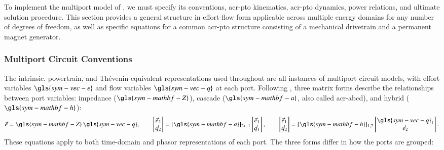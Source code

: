 \label{sec:appendix-pto-model}
To implement the multiport model of , we must specify its
conventions, \gls{acr-pto} kinematics, \gls{acr-pto} dynamics, power relations, and ultimate solution procedure.
This section provides a general structure in effort-flow form applicable across multiple energy domains for any number of degrees of freedom, as well as specific equations for a common \gls{acr-pto} structure consisting of a mechanical drivetrain and a permanent magnet generator.

\subsubsection{Multiport Circuit Conventions}
\label{sec:appendix-multiport}

The intrinsic, powertrain, and Th\'evenin-equivalent representations used throughout  are all instances of multiport circuit models,
with effort variables $\gls{sym-vec-e}$ and flow variables $\gls{sym-vec-q}$ at each port.
Following \citet{reveyrand_multiport_2018}, three matrix forms describe the relationships between port variables:
impedance ($\gls{sym-mathbf-Z}$), cascade ($\gls{sym-mathbf-a}$, also called \gls{acr-abcd}), and hybrid ($\gls{sym-mathbf-h}$):
\begin{equation}\label{eq:multiport-matrix-definitions}
    \vec{e} = \gls{sym-mathbf-Z}\,\gls{sym-vec-q},
\qquad
    \begin{bmatrix}
        \vec{e}_2 \\ \vec{q}_2
    \end{bmatrix}
    = [\gls{sym-mathbf-a}]_{2\leftarrow 1}
    \begin{bmatrix}
        \vec{e}_1 \\ \vec{q}_1
    \end{bmatrix},
\qquad
    \begin{bmatrix}
        \vec{e}_1 \\ \vec{q}_2
    \end{bmatrix}
    = [\gls{sym-mathbf-h}]_{1,2}
    \begin{bmatrix}
        \gls{sym-vec-q}_1 \\ \vec{e}_2
    \end{bmatrix}.
\end{equation}
These equations apply to both time-domain and phasor representations of each port.
The three forms differ in how the ports are grouped:
